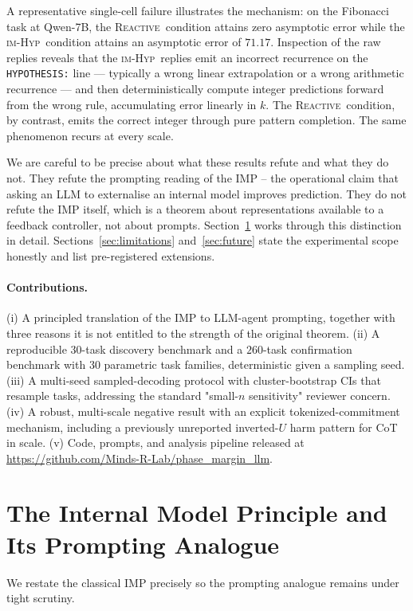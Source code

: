 \documentclass[11pt]{article}
\newcommand{\imhyp}{\textsc{im-Hyp}}
\newcommand{\reactive}{\textsc{Reactive}}
\begin{document}
A representative single-cell failure illustrates the mechanism:  on
the Fibonacci task at Qwen-7B, the \reactive\ condition attains zero
asymptotic error while the \imhyp\ condition attains an asymptotic
error of $71.17$.  Inspection of the raw replies reveals that the
\imhyp\ replies emit an incorrect recurrence on the
\verb|HYPOTHESIS:| line --- typically a wrong linear extrapolation
or a wrong arithmetic recurrence --- and then deterministically
compute integer predictions forward from the wrong rule, accumulating
error linearly in $k$.  The \reactive\ condition, by contrast, emits
the correct integer through pure pattern completion.  The same
phenomenon recurs at every scale.

We are careful to be precise about what these results refute and
what they do not.  They refute the prompting reading of the IMP --
the operational claim that asking an LLM to externalise an internal
model improves prediction.  They do not refute the IMP itself,
which is a theorem about representations available to a feedback
controller, not about prompts.  Section~\ref{sec:imp} works through
this distinction in detail.  Sections~\ref{sec:limitations}
and~\ref{sec:future} state the experimental scope honestly and
list pre-registered extensions.

\paragraph{Contributions.}
(i) A principled translation of the IMP to LLM-agent prompting,
together with three reasons it is not entitled to the strength of
the original theorem.
(ii) A reproducible $30$-task discovery benchmark and a
$260$-task confirmation benchmark with $30$ parametric task
families, deterministic given a sampling seed.
(iii) A multi-seed sampled-decoding protocol with cluster-bootstrap
CIs that resample tasks, addressing the standard "small-$n$
sensitivity" reviewer concern.
(iv) A robust, multi-scale negative result with an explicit
tokenized-commitment mechanism, including a previously unreported
inverted-$U$ harm pattern for CoT in scale.
(v) Code, prompts, and analysis pipeline released at
\url{https://github.com/Minds-R-Lab/phase_margin_llm}.

\section{The Internal Model Principle and Its Prompting Analogue}
\label{sec:imp}

We restate the classical IMP precisely so the prompting analogue
remains under tight scrutiny.
\end{document}
